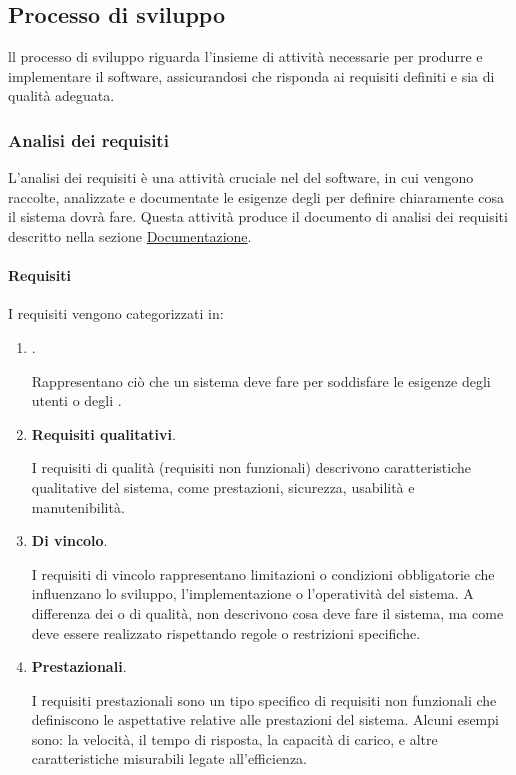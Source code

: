 \subsection{Processo di sviluppo}
\label{subsection:processo_sviluppo}
ll processo di sviluppo riguarda l'insieme di attività necessarie per produrre e implementare il software, assicurandosi che risponda ai requisiti definiti e sia di qualità adeguata.

\subsubsection{Analisi dei requisiti}
L'analisi dei requisiti è una attività cruciale nel  del software, in cui vengono raccolte, analizzate e documentate le esigenze degli  per definire chiaramente cosa il sistema dovrà fare. 
Questa attività produce il documento di analisi dei requisiti descritto nella sezione \hyperref[subsec:documentazione]{Documentazione}.

\paragraph{Requisiti}
I requisiti vengono categorizzati in:
\begin{enumerate}
    \item \textbf{}.
    
    Rappresentano ciò che un sistema deve fare per soddisfare le esigenze degli utenti o degli .

    \item \textbf{Requisiti qualitativi}.
    
    I requisiti di qualità (requisiti non funzionali) descrivono caratteristiche qualitative del sistema, come prestazioni, sicurezza, usabilità e manutenibilità.

    \item \textbf{Di vincolo}.
    
    I requisiti di vincolo rappresentano limitazioni o condizioni obbligatorie che influenzano lo sviluppo, l'implementazione o l'operatività del sistema. 
    A differenza dei  o di qualità, non descrivono cosa deve fare il sistema, ma come deve essere realizzato rispettando regole o restrizioni specifiche. 

    \item \textbf{Prestazionali}.
    
    I requisiti prestazionali sono un tipo specifico di requisiti non funzionali che definiscono le aspettative relative alle prestazioni del sistema.
    Alcuni esempi sono: la velocità, il tempo di risposta, la capacità di carico, e altre caratteristiche misurabili legate all'efficienza.
\end{enumerate}

